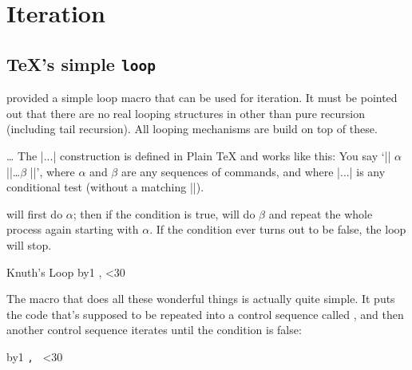 \chapter{Iteration}

\section{\TeX's simple \protect\texttt{loop}}

 provided a simple loop macro that can be used for iteration. It must be pointed out that there are no real looping structures in \tex other than pure recursion (including tail recursion). All looping mechanisms are build on top of these.

\begin{command}{\loop\ldots\string\repeat}
The |\loop...\repeat| construction is defined in Plain TeX and works like this:
You say `|\loop| $\alpha$ |\if|\dots $\beta$  |\repeat|', where $\alpha$ and $\beta$ are any sequences of
commands, and where |\if...| is any conditional test (without a matching |\fi|). 
\end{command}

\tex
will first do $\alpha$; then if the condition is true, \tex will do $\beta$ and repeat the whole process
again starting with $\alpha$. If the condition ever turns out to be false, the loop will stop.

\begin{texexample}{Knuth's Loop}{}
\bgroup
\newcount\n
{}
\loop
   \advance\n by1
     \number\n,   
   \ifnum\n<30
\repeat
\egroup
\end{texexample}




The \cmd{\loop} macro that does all these wonderful things is actually quite simple.
It puts the code that's supposed to be repeated into a control sequence called
\cmd{\body}, and then another control sequence iterates until the condition is false:

\begin{teX}
\def\loop#1\repeat{\def\body{#1}\iterate}
\def\iterate{\body\let\next=\iterate\else\let\next=\relax\fi\next}
\end{teX}


\noindent\colorbox{gray!10}{\parbox{10cm}{\noindent
\newcount\n
{}
\loop
   \advance\n by1
     \texttt{\number\n, } 
   \ifnum\n<30
\repeat
}}
\bigskip

